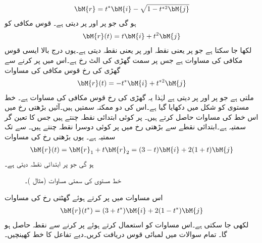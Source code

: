 \begin{align*}
\bM{r}=t^*\bM{i}-\sqrt{1-t^{*2}\bM{j}}
\end{align*}
ہو گی جو  پر  اور  پر  دیتی ہے۔
قوس مکافی  کو
\begin{align*}
\bM{r}(t)=t\bM{i}+t^2\bM{j}
\end{align*}
لکھا جا سکتا ہے جو  پر  یعنی نقطہ  اور  پر  یعنی نقطہ  دیتی ہے۔یوں درج بالا  ایسی قوس مکافی کی مساوات ہے جس پر سمت گھڑی کی الٹ رخ ہے۔اس میں  پر کرنے سے گھڑی کی رخ قوس مکافی کی مساوات 
\begin{align*}
\bM{r}(t)=-t^*\bM{i}+t^{*2}\bM{j}
\end{align*}
ملتی ہے جو  پر  اور  پر  دیتی ہے لہٰذا یہ گھڑی کی رخ قوس مکافی کی مساوات ہے۔
خط مستوی  کو شکل  میں دکھایا گیا ہے۔اس کی دو ممکنہ سمتیں ہیں۔آئیں بڑھتی  رخ میں اس خط کی  مساوات حاصل کرتے ہیں۔ پر کوئی ابتدائی نقطہ   چنتے ہیں جس کا  تعین گر سمتیہ   ہے۔ابتدائی نقطے سے بڑھتی  رخ میں  پر کوئی دوسرا نقطہ  چنتے ہیں۔ سے  تک سمتیہ  ہے۔ یوں بڑھتی  رخ  کی مساوات 
\begin{align*}
\bM{r}(t)=\bM{r}_1+t\bM{r}_2=(3-t)\bM{i}+2(1+t)\bM{j}
\end{align*}
 ہو گی جو  پر ابتدائی نقطہ  دیتی ہے۔
\begin{figure}
\centering
{}
\caption{خط مستوی کی سمتی مساوات (مثال )۔}
\label{شکل_مثال_الاحصاء_خط_مستوی_سمتی}
\end{figure}

اس مساوات میں  پر کرتے ہوئے گھٹتی  رخ  کی مساوات 
\begin{align*}
\bM{r}(t^*)=(3+t^*)\bM{i}+2(1-t^*)\bM{j}
\end{align*}
لکھی جا سکتی ہے۔اس مساوات کو استعمال کرتے ہوئے   پر کرنے سے نقطہ  حاصل ہو گا۔ 
تمام سوالات میں لمبائی قوس دریافت کریں۔دیے تفاعل کا خط کھینچیں۔

